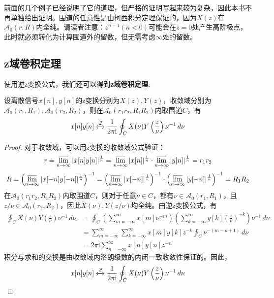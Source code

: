 前面的几个例子已经说明了它的道理，但严格的证明写起来较为复杂，因此本书不再单独给出证明。围道的任意性是由柯西积分定理保证的，因为$X(z)$在$\mathcal{A} _0(r,R)$内全纯。请读者注意：$z^{n-1}(n<0)$可能会在$z=0$处产生高阶极点，此时就必须转化为计算围道外的留数，但无需考虑$\infty$处的留数。

\subsection{z域卷积定理}\label{sub:z_convolution}

使用逆z变换公式，我们还可以得到\textbf{z域卷积定理}:
\begin{theorem}[z域卷积定理]
    设离散信号$x[n],y[n]$的z变换分别为$X(z),Y(z)$，收敛域分别为$\mathcal{A} _0(r_1,R_1),\mathcal{A} _0(r_2,R_2)$，则在$\mathcal{A} _0(r_1 r_2,R_1 R_2)$内取围道$C$，有
    \[x[n]y[n]\xleftrightarrow{\mathcal{Z}} \frac{1}{2\pi \mathrm{i}}\oint_{C}X(\nu)Y\left(\frac{z}{\nu}\right)\nu^{-1}\,d\nu\]
\end{theorem}
\begin{proof}
    对于收敛域，可以用z变换的收敛域公式验证：
    \[r=\varlimsup_{n\to\infty}|x[n]y[n]|^{\frac{1}{n}}=\varlimsup_{n\to\infty}|x[n]|^{\frac{1}{n}}\cdot\varlimsup_{n\to\infty}|y[n]|^{\frac{1}{n}}=r_1 r_2\]
    \[R=\left(\varlimsup_{n\to\infty}|x[-n]y[-n]|^{\frac{1}{n}}\right)^{-1}=\left(\varlimsup_{n\to\infty}|x[-n]|^{\frac{1}{n}}\right)^{-1}\cdot\left(\varlimsup_{n\to\infty}|y[-n]|^{\frac{1}{n}}\right)^{-1}=R_1 R_2\]
    在$\mathcal{A} _0(r_1 r_2,R_1 R_2)$内取围道$C$，则对于任意$\nu\in C$，都有$\nu\in\mathcal{A} _0(r_1,R_1)$，且$z/\nu\in\mathcal{A} _0(r_2,R_2)$，因此$X(\nu),Y(z/\nu)$均全纯。由逆z变换公式，有
    \begin{align*}
        \oint_{C}X(\nu)Y\left(\frac{z}{\nu}\right)\nu^{-1}\,d\nu&=\oint_{C}\left(\sum_{m=-\infty}^{\infty}x[m]\nu^{-m}\right)\left(\sum_{k=-\infty}^{\infty}y[k]\left(\frac{z}{\nu}\right)^{-k}\right)\nu^{-1}\,d\nu\\
        &=\sum_{m=-\infty}^{\infty}\sum_{k=-\infty}^{\infty}x[m]y[k]z^{-k}\oint_{C}\nu^{-(m-k+1)}\,d\nu\\
        &=2\pi \mathrm{i} \sum_{n=-\infty}^{\infty}x[n]y[n]z^{-n}
    \end{align*}
    积分与求和的交换是由收敛域内洛朗级数的内闭一致收敛性保证的。因此，
    \[x[n]y[n]\xleftrightarrow{\mathcal{Z}} \frac{1}{2\pi \mathrm{i}}\oint_{C}X(\nu)Y\left(\frac{z}{\nu}\right)\nu^{-1}\,d\nu\]
\end{proof}

